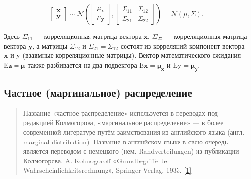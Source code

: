 \documentclass[11pt,a4paper]{article}
\begin{document}
\[
\begin{bmatrix}
    \mathbf{x} \\
    \mathbf{y} 
\end{bmatrix}
\sim
\mathcal{N}\left(
\begin{bmatrix}
    \mu_{\mathbf{x}} \\
    \mu_{\mathbf{y}}
\end{bmatrix},
\begin{bmatrix}
    \Sigma_{11} & \Sigma_{12} \\
    \Sigma_{21} & \Sigma_{22}
\end{bmatrix}
\right)
= \mathcal{N}(\mu, \Sigma).
\]

Здесь \(\Sigma_{11}\) --- корреляционная матрица вектора \(\mathbf{x}\),
\(\Sigma_{22}\) --- корреляционная матрица вектора \(\mathbf{y}\), а
матрицы \(\Sigma_{12}\) и \(\Sigma_{21} = \Sigma_{12}^\top\) состоят из
корреляций компонент вектора \(\mathbf{x}\) и \(\mathbf{y}\) (взаимные
корреляционные матрицы). Вектор математического ожидания
\(\mathrm{E}\mathbf{z} = \mathbf{\mu}\) также разбивается на два
подвектора \(\mathrm{E}\mathbf{x} = \mathbf{\mu_x}\) и
\(\mathrm{E}\mathbf{y} = \mathbf{\mu_y}\).

    \hypertarget{ux447ux430ux441ux442ux43dux44bux435-ux43cux430ux440ux433ux438ux43dux430ux43bux44cux43dux44bux435-ux440ux430ux441ux43fux440ux435ux434ux435ux43bux435ux43dux438ux44f}{%
\subsection{Частное (маргинальное)
распределение}\label{ux447ux430ux441ux442ux43dux44bux435-ux43cux430ux440ux433ux438ux43dux430ux43bux44cux43dux44bux435-ux440ux430ux441ux43fux440ux435ux434ux435ux43bux435ux43dux438ux44f}}

\begin{quote}
Название «частное распределение» используется в переводах под редакцией
Колмогорова, «маргинальное распределение» --- в более современной
литературе путём заимствования из английского языка (англ. marginal
distribution). Название в английском языке в свою очередь является
переводом с немецкого (нем. Randverteilungen) из публикации Колмогорова:
A. Kolmogoroff «Grundbegriffe der Wahrscheinlichkeitsrechnung»,
Springer-Verlag, 1933.
\href{https://ru.wikipedia.org/wiki/\%D0\%A7\%D0\%B0\%D1\%81\%D1\%82\%D0\%BD\%D0\%BE\%D0\%B5_\%D1\%80\%D0\%B0\%D1\%81\%D0\%BF\%D1\%80\%D0\%B5\%D0\%B4\%D0\%B5\%D0\%BB\%D0\%B5\%D0\%BD\%D0\%B8\%D0\%B5}{{[}1{]}}
\end{quote}
\end{document}
